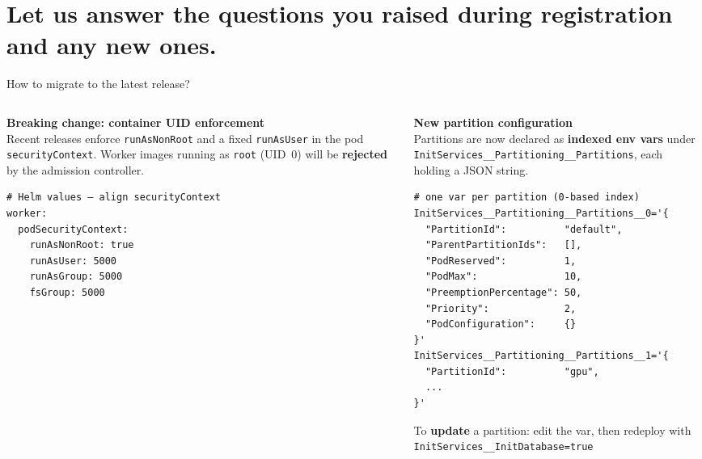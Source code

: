 \section{Let us answer the questions you raised during registration and any new ones.}

\begin{frame}[fragile]{How to migrate to the latest release?}
	\begin{columns}[T]
		\begin{column}{0.4\textwidth}
			\textbf{Breaking change: container UID enforcement}\\
			{\footnotesize Recent releases enforce \texttt{runAsNonRoot} and a fixed \texttt{runAsUser} in the pod \texttt{securityContext}. Worker images running as \texttt{root} (UID~0) will be \textbf{rejected} by the admission controller.}
			\vspace{2pt}
			\begin{verbatim}
# Helm values — align securityContext
worker:
  podSecurityContext:
    runAsNonRoot: true
    runAsUser: 5000
    runAsGroup: 5000
    fsGroup: 5000
			\end{verbatim}
		\end{column}
		\begin{column}{0.6\textwidth}
			\textbf{New partition configuration}\\
			{\footnotesize Partitions are now declared as \textbf{indexed env vars} under
			\texttt{InitServices\_\_Partitioning\_\_Partitions}, each holding a JSON string.}
			\vspace{-1pt}
			\begin{verbatim}
# one var per partition (0-based index)
InitServices__Partitioning__Partitions__0='{
  "PartitionId":          "default",
  "ParentPartitionIds":   [],
  "PodReserved":          1,
  "PodMax":               10,
  "PreemptionPercentage": 50,
  "Priority":             2,
  "PodConfiguration":     {}
}'
InitServices__Partitioning__Partitions__1='{
  "PartitionId":          "gpu",
  ...
}'
			\end{verbatim}
			{\footnotesize To \textbf{update} a partition: edit the var, then redeploy with\\
			\texttt{InitServices__InitDatabase=true}}
		\end{column}
	\end{columns}
\end{frame}

